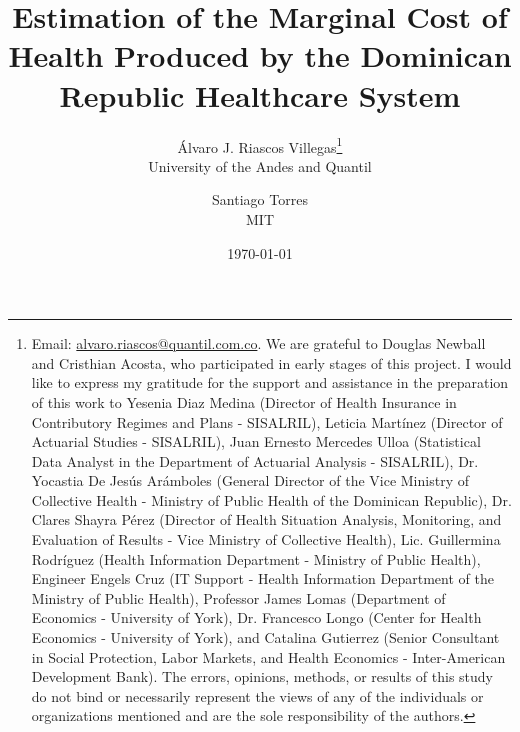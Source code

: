 \documentclass[11pt]{article}
\numberwithin{equation}{section}
\theoremstyle{remark}
\begin{document}
\begin{titlepage}
\title{Estimation of the Marginal Cost of Health Produced by the Dominican Republic Healthcare System}
\author{Álvaro J. Riascos Villegas\thanks{Email: \href{mailto:alvaro.riascos@quantil.com.co}{alvaro.riascos@quantil.com.co}. We are grateful to Douglas Newball and Cristhian Acosta, who participated in early stages of this project. I would like to express my gratitude for the support and assistance in the preparation of this work to Yesenia Diaz Medina (Director of Health Insurance in Contributory Regimes and Plans - SISALRIL), Leticia Martínez (Director of Actuarial Studies - SISALRIL), Juan Ernesto Mercedes Ulloa (Statistical Data Analyst in the Department of Actuarial Analysis - SISALRIL), Dr. Yocastia De Jesús Arámboles (General Director of the Vice Ministry of Collective Health - Ministry of Public Health of the Dominican Republic), Dr. Clares Shayra Pérez (Director of Health Situation Analysis, Monitoring, and Evaluation of Results - Vice Ministry of Collective Health), Lic. Guillermina Rodríguez (Health Information Department - Ministry of Public Health), Engineer Engels Cruz (IT Support - Health Information Department of the Ministry of Public Health), Professor James Lomas (Department of Economics - University of York), Dr. Francesco Longo (Center for Health Economics - University of York), and Catalina Gutierrez (Senior Consultant in Social Protection, Labor Markets, and Health Economics - Inter-American Development Bank). The errors, opinions, methods, or results of this study do not bind or necessarily represent the views of any of the individuals or organizations mentioned and are the sole responsibility of the authors.} \\ University of the Andes and Quantil \and Santiago Torres \\ MIT %
}
\date{\today}


\end{titlepage}
\end{document}
